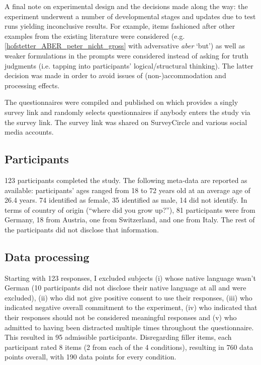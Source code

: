 \documentclass[output=paper]{langsci/langscibook}
\begin{document}
A final note on experimental design and the decisions made along the way: the experiment underwent a number of developmental stages and updates due to test runs yielding inconclusive results. For example, items fashioned after other examples from the existing literature were considered (e.g. \ref{hofstetter_ABER_peter_nicht_gross} with adversative \textit{aber} `but') as well as weaker formulations in the prompts were considered instead of asking for truth judgments (i.e. tapping into participants' logical\slash structural thinking). The latter decision was made in order to avoid issues of \mbox{(non-)}accommodation and processing effects.

The questionnaires were compiled and published on  which provides a singly survey link and randomly selects questionnaires if anybody enters the study via the survey link. The survey link was shared on SurveyCircle \citep{survey_circle_website} and various social media accounts.

\subsection{Participants}

123 participants completed the study. The following meta-data are reported as available: participants' ages ranged from 18 to 72 years old at an average age of 26.4 years. 74 identified as female, 35 identified as male, 14 did not identify. In terms of country of origin (``where did you grow up?''), 81 participants were from Germany, 18 from Austria, one from Switzerland, and one from Italy. The rest of the participants did not disclose that information.

\subsection{Data processing}

Starting with 123 responses, I excluded subjects (i) whose native language wasn't German (10 participants did not disclose their native language at all and were excluded), (ii) who did not give positive consent to use their responses, (iii) who indicated negative overall commitment to the experiment, (iv) who indicated that their responses should not be considered meaningful responses and (v) who admitted to having been distracted multiple times throughout the questionnaire. This resulted in 95 admissible participants. Disregarding filler items, each participant rated 8 items (2 from each of the 4 conditions), resulting in 760 data points overall, with 190 data points for every condition.
\end{document}
